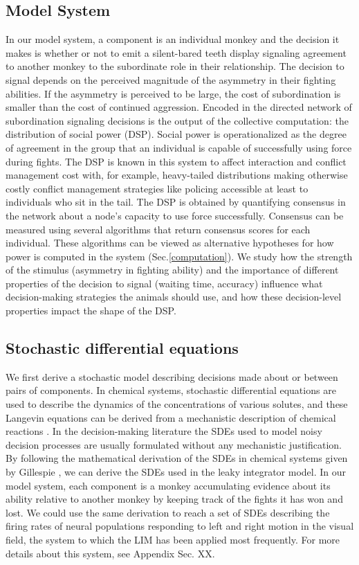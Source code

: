\documentclass{pnastwo}
\begin{document}
\begin{article}
\subsection{Model System}
In our model system, a component is an individual monkey and the decision it makes is whether or not to emit a silent-bared teeth display signaling agreement to another monkey to the subordinate role in their relationship. The decision to signal depends on the perceived magnitude of the asymmetry in their fighting abilities. If the asymmetry is perceived to be large, the cost of subordination is smaller than the cost of continued aggression. Encoded in the directed network of subordination signaling decisions is the output of the collective computation: the distribution of social power (DSP). Social power is operationalized as the degree of agreement in the group that an individual is capable of successfully using force during fights. The DSP is known in this system to affect interaction and conflict management cost with, for example, heavy-tailed distributions making otherwise costly conflict management strategies like policing accessible at least to individuals who sit in the tail. The DSP is obtained by quantifying consensus in the network about a node's capacity to use force successfully. Consensus can be measured using several algorithms that return consensus scores for each individual. These algorithms can be viewed as alternative hypotheses for how power is computed in the system (Sec.\ref{computation}). We study how the strength of the stimulus (asymmetry in fighting ability) and the importance of different properties of the decision to signal (waiting time, accuracy) influence what decision-making strategies the animals should use, and how these decision-level properties impact the shape of the DSP. 


\subsection{Stochastic differential equations}    
We first derive a stochastic model describing decisions made about or between pairs of components. In chemical systems, stochastic differential equations are used to describe the dynamics of the concentrations of various solutes, and these Langevin equations can be derived from a mechanistic description of chemical reactions \cite{Gillespie:1992vn,Gillespie:2000fk}. In the decision-making literature the SDEs used to model noisy decision processes are usually formulated without any mechanistic justification. By following the mathematical derivation of the SDEs in chemical systems given by Gillespie \cite{Gillespie:2000fk},  we can derive the SDEs used in the leaky integrator model. In our model system, each component is a monkey accumulating evidence about its ability relative to another monkey by keeping track of the fights it has won and lost. We could use the same derivation to reach a set of SDEs describing the firing rates of neural populations responding to left and right motion in the visual field, the system to which the LIM has been applied most frequently. For more details about this system, see Appendix Sec. XX. 


\end{article}
\end{document}
